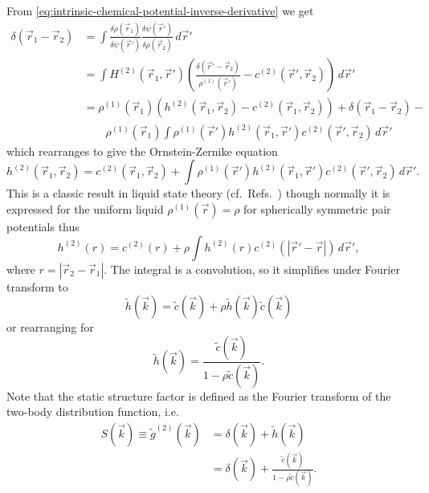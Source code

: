 From \eqref{eq:intrinsic-chemical-potential-inverse-derivative} we get
\begin{equation*}
  \begin{aligned}
    \delta(\vec{r}_1 - \vec{r}_2) &=
    \int
    \frac{\delta \rho(\vec{r}_1)}{\delta \psi(\vec{r}')}
    \frac{\delta \psi(\vec{r}')}{\delta \rho(\vec{r}_2)}
    \, d\vec{r}' \\
    &=
    \int
    H^{(2)}(\vec{r}_1, \vec{r}')
    \left(
    \frac{\delta(\vec{r}' - \vec{r}_2)}{\rho^{(1)}(\vec{r}')} -
    c^{(2)}(\vec{r}', \vec{r}_2)
    \right)
    \, d\vec{r}' \\
    &=
    \rho^{(1)}(\vec{r}_1)
    \left(
    h^{(2)}(\vec{r}_1, \vec{r}_2) -
    c^{(2)}(\vec{r}_1, \vec{r}_2)
    \right) +
    \delta(\vec{r}_1 - \vec{r}_2) - \\
    &\qquad
    \rho^{(1)}(\vec{r}_1)
    \int
    \rho^{(1)}(\vec{r}')
    h^{(2)}(\vec{r}_1, \vec{r}')
    c^{(2)}(\vec{r}', \vec{r}_2)
    \, d\vec{r}'
  \end{aligned}
\end{equation*}
which rearranges to give the Ornstein-Zernike equation
\begin{equation}
  h^{(2)}(\vec{r}_1, \vec{r}_2) =
  c^{(2)}(\vec{r}_1, \vec{r}_2) +
  \int
  \rho^{(1)}(\vec{r}')
  h^{(2)}(\vec{r}_1, \vec{r}')
  c^{(2)}(\vec{r}', \vec{r}_2)
  \, d\vec{r}'.
\end{equation}
This is a classic result in liquid state theory (cf.\ Refs.\ \cite{Ornstein1914,Hansen2010,Evans1979}) though normally it is expressed for the uniform liquid $\rho^{(1)}(\vec{r}) = \rho$ for spherically symmetric pair potentials thus
\begin{equation}
  h^{(2)}(r) =
  c^{(2)}(r) +
  \rho
  \int
  h^{(2)}(r)
  c^{(2)}(|\vec{r}' - \vec{r}|)
  \, d\vec{r}',
\end{equation}
where $r = |\vec{r}_2 - \vec{r}_1|$.
The integral is a convolution, so it simplifies under Fourier transform to
\begin{equation}
  \tilde{h}(\vec{k}) =
  \tilde{c}(\vec{k}) +
  \rho \tilde{h}(\vec{k}) \tilde{c}(\vec{k})
\end{equation}
or rearranging for
\begin{equation}
  \tilde{h}(\vec{k}) =
  \frac{\tilde{c}(\vec{k})}{1 - \rho \tilde{c}(\vec{k})}.
\end{equation}
Note that the static structure factor is defined as the Fourier transform of the two-body distribution function, i.e.\
\begin{equation}
  \begin{aligned}
    S(\vec{k}) \equiv \tilde{g}^{(2)}(\vec{k}) &=
    \delta(\vec{k}) + \tilde{h}(\vec{k}) \\
    &=
    \delta(\vec{k}) +
    \frac{\tilde{c}(\vec{k})}{1 - \rho \tilde{c}(\vec{k})}.
  \end{aligned}
\end{equation}


